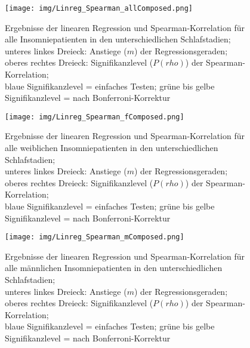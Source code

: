 


\begin{figure}[H]
	\centering
	\texttt{[image: img/Linreg\_Spearman\_allComposed.png]}
	\caption[Ergebnisse der linearen Regression und Spearman-Korrelation für alle Insomniepatienten]{Ergebnisse der linearen Regression und Spearman-Korrelation für alle Insomniepatienten in den unterschiedlichen Schlafstadien;\\unteres linkes Dreieck: Anstiege ($m$) der Regressionsgeraden;\\oberes rechtes Dreieck: Signifikanzlevel ($P(rho)$) der Spearman-Korrelation;\\blaue Signifikanzlevel = einfaches Testen; grüne bis gelbe Signifikanzlevel = nach Bonferroni-Korrektur}
	\label{fig:Linreg_Spearman_allComposed}
\end{figure}



\begin{figure}[H]
	\centering
	\texttt{[image: img/Linreg\_Spearman\_fComposed.png]}
	\caption[Ergebnisse der linearen Regression und Spearman-Korrelation für alle weiblichen Insomniepatienten]{Ergebnisse der linearen Regression und Spearman-Korrelation für alle weiblichen Insomniepatienten in den unterschiedlichen Schlafstadien;\\unteres linkes Dreieck: Anstiege ($m$) der Regressionsgeraden;\\oberes rechtes Dreieck: Signifikanzlevel ($P(rho)$) der Spearman-Korrelation;\\blaue Signifikanzlevel = einfaches Testen; grüne bis gelbe Signifikanzlevel = nach Bonferroni-Korrektur}
	\label{fig:Linreg_Spearman_fComposed}
\end{figure}




\begin{figure}[H]
	\centering
	\texttt{[image: img/Linreg\_Spearman\_mComposed.png]}
	\caption[Ergebnisse der linearen Regression und Spearman-Korrelation für alle männlichen Insomniepatienten]{Ergebnisse der linearen Regression und Spearman-Korrelation für alle männlichen Insomniepatienten in den unterschiedlichen Schlafstadien;\\unteres linkes Dreieck: Anstiege ($m$) der Regressionsgeraden;\\oberes rechtes Dreieck: Signifikanzlevel ($P(rho)$) der Spearman-Korrelation;\\blaue Signifikanzlevel = einfaches Testen; grüne bis gelbe Signifikanzlevel = nach Bonferroni-Korrektur}
	\label{fig:Linreg_Spearman_mComposed}
\end{figure}


